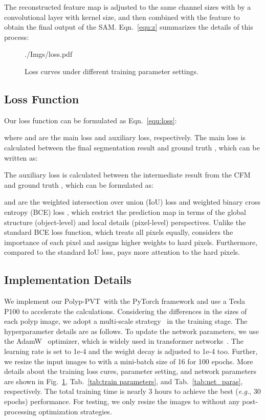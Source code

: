 \documentclass[journal]{IEEEtran}
\newcommand{\figref}[1]{Fig.~\ref{#1}}
\newcommand{\tabref}[1]{Tab.~\ref{#1}}
\def\ourmodel{Polyp-PVT}
\begin{document}
The reconstructed feature map  is adjusted to the same channel sizes with  by a convolutional layer  with  kernel size, and then combined with the feature  to obtain the final output  of the SAM. 
Eqn.~\ref{equ:z} summarizes the details of this process:


\begin{figure}[t!]
 	\centering
 	\begin{overpic}[width=\linewidth]{./Imgs/loss.pdf}
    \end{overpic}
    \vspace{-10pt}
 	\caption{Loss curves under different training parameter settings.}
     \label{figure:loss}
\end{figure}
\subsection{Loss Function}\label{subsec:Supervision Strategy}

Our loss function can be formulated as Eqn.~\ref{equ:loss}:

where  and  are the main loss and auxiliary loss, respectively. 
The main loss  is calculated between the final segmentation result  and ground truth , which can be written as:


The auxiliary loss  is calculated between the intermediate result  from the CFM and ground truth , which can be formulated as:


 and  are the weighted intersection over union (IoU) loss \cite{wei2020f3net} and weighted binary cross entropy (BCE) loss \cite{wei2020f3net}, which restrict the prediction map in terms of the global structure (object-level) and local details (pixel-level) perspectives.
Unlike the standard BCE loss function, which treats all pixels equally,  considers the importance of each pixel and assigns higher weights to hard pixels.
Furthermore, compared to the standard IoU loss,  pays more attention to the hard pixels.

\subsection{Implementation Details}\label{subsection: Implementation Details}
We implement our \ourmodel~with the PyTorch framework and use a Tesla P100 to accelerate the calculations.
Considering the differences in the sizes of each polyp image, 
we adopt a multi-scale strategy~\cite{fan2020pranet,huang2021hardnet} in the training stage. 
The hyperparameter details are as follows.
To update the network parameters, we use the AdamW~\cite{loshchilov2019adamw} optimizer, which is widely used in transformer networks~\cite{wang2021pyramid,liu2021swin,wang2021pvtv2}. 
The learning rate is set to 1e-4 and the weight decay is adjusted to 1e-4 too. 
Further, we resize the input images to  with a mini-batch size of 16 for 100 epochs. More details about the training loss cures, parameter setting, and network parameters are shown in \figref{figure:loss}, \tabref{tab:train parameters}, and \tabref{tab:net_paras}, respectively.
The total training time is nearly 3 hours to achieve the best (\emph{e.g.}, 30 epochs) performance.
For testing, we only resize the images to  without any post-processing optimization strategies.
\end{document}
